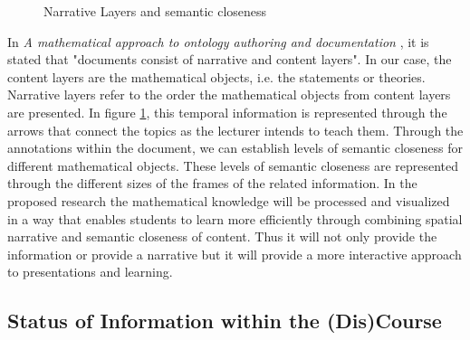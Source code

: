 \documentclass[twoside, 12pt]{article}
\begin{document}
\begin{figure}
\vspace{-26pt}
  \begin{center}
  \end{center}
\vspace{-20pt}
  \caption{Narrative Layers and semantic closeness}
  \label{fig:Annie-semantic-closeness}
\vspace{-10pt}
\end{figure}

In \textit{A mathematical approach to ontology authoring and
documentation} \cite{LK:MathOntoAuthDoc09}, it is stated that "documents consist of narrative and content layers". In our case, the content layers are the mathematical objects, i.e. the statements or theories. Narrative layers refer to the order the mathematical objects from content layers are presented. In figure \ref{fig:Annie-semantic-closeness}, this temporal information is represented through the arrows that connect the topics as the lecturer intends to teach them. Through the annotations within the document, we can establish levels of semantic closeness for different mathematical objects. These levels of semantic closeness are represented through the different sizes of the frames of the related information. In the proposed research the mathematical knowledge will be processed and visualized in a way that enables students to learn more efficiently through combining spatial narrative and semantic closeness of content. Thus it will not only provide the information or provide a narrative but it will provide a more interactive approach to presentations and learning.\\

\subsection{Status of Information within the (Dis)Course}
\label{sec:infostatus}
\end{document}
